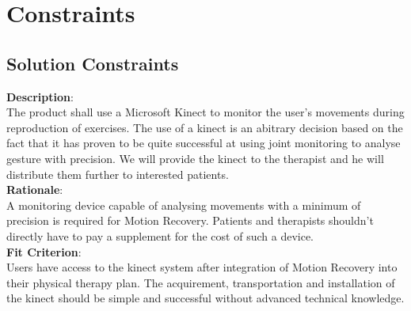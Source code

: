 \section{Constraints}
\subsection{Solution Constraints}
\begin{tcolorbox}[minimalcard]
    \raggedright\textbf{Description}: \vspace{6pt}\\
    The product shall use a Microsoft Kinect to monitor the user's movements during reproduction of exercises. The use of a kinect is an abitrary decision based on the fact that it has proven to be quite successful at using joint monitoring to analyse gesture with precision. We will provide the kinect to the therapist and he will distribute them further to interested patients.\\
    \vspace{6pt}
    \textbf{Rationale}: \vspace{6pt}\\
    A monitoring device capable of analysing movements with a minimum of precision is required for Motion Recovery. Patients and therapists shouldn't directly have to pay a supplement for the cost of such a device.\\
    \vspace{6pt}
    \textbf{Fit Criterion}: \vspace{6pt}\\
    Users have access to the kinect system after integration of Motion Recovery into their physical therapy plan. The acquirement, transportation and installation of the kinect should be simple and successful without advanced technical knowledge.  
\end{tcolorbox}
